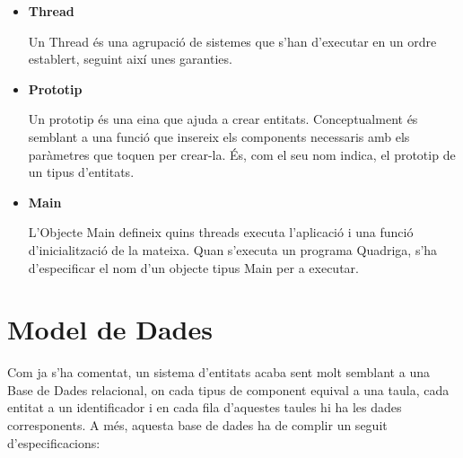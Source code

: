 \begin{itemize}
    \item{\bf Thread}

      Un Thread és una agrupació de sistemes que s'han d'executar en un ordre establert, seguint així unes garanties.

    \item{\bf Prototip}

      Un prototip és una eina que ajuda a crear entitats. Conceptualment és semblant a una funció que insereix els components necessaris amb els paràmetres que toquen per crear-la. És, com el seu nom indica, el prototip de un tipus d'entitats.

    \item{\bf Main}

      L'Objecte Main defineix quins threads executa l'aplicació i una funció d'inicialització de la mateixa. Quan s'executa un programa Quadriga, s'ha d'especificar el nom d'un objecte tipus Main per a executar.
    
  \end{itemize}

\section{Model de Dades}

  Com ja s'ha comentat, un sistema d'entitats acaba sent molt semblant a una Base de Dades relacional, on cada tipus de component equival a una taula, cada entitat a un identificador i en cada fila d'aquestes taules hi ha les dades corresponents. A més, aquesta base de dades ha de complir un seguit d'especificacions:

